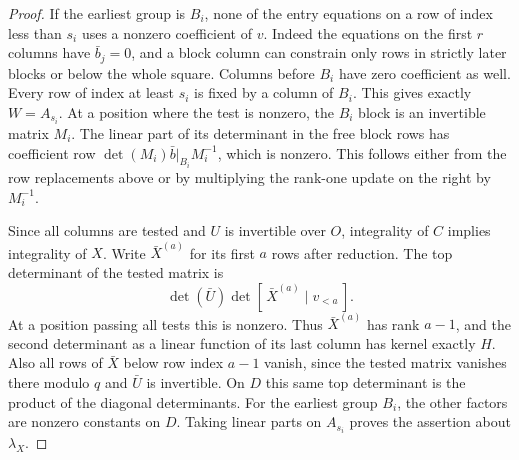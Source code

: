 \documentclass[a4paper,11pt]{article}
\theoremstyle{definition}
\theoremstyle{remark}
\numberwithin{equation}{section}
\begin{document}
\begin{proof}
If the earliest group is \(B_i\), none of the entry equations
on a row of index less than \(s_i\) uses a nonzero coefficient
of \(v\). Indeed the equations on the first \(r\) columns have
\(\bar b_j=0\), and a block column can constrain only rows
in strictly later blocks or below the whole square. Columns
before \(B_i\) have zero coefficient as well. Every row of
index at least \(s_i\) is fixed by a column of \(B_i\).
This gives exactly \(W=A_{s_i}\). At a position where the
test is nonzero, the \(B_i\) block is an invertible matrix
\(M_i\). The linear part of its determinant in the free block
rows has coefficient row \(\det(M_i)\bar b|_{B_i}M_i^{-1}\),
which is nonzero. This follows either from the row replacements
above or by multiplying the rank-one update on the right
by \(M_i^{-1}\).

Since all columns are tested and \(U\) is invertible over
\(O\), integrality of \(C\) implies integrality of \(X\).
Write \(\bar X^{(a)}\) for its first \(a\) rows after reduction.
The top determinant of the tested matrix is
\[
       \det(\bar U)\det[\,\bar X^{(a)}\mid v_{<a}\,].
\]
At a position passing all tests this is nonzero. Thus
\(\bar X^{(a)}\) has rank \(a-1\), and the second determinant
as a linear function of its last column has kernel exactly
\(H\). Also all rows of \(\bar X\) below row index \(a-1\)
vanish, since the tested matrix vanishes there modulo \(q\)
and \(\bar U\) is invertible. On \(D\) this same top
determinant is the product of the diagonal determinants.
For the earliest group \(B_i\), the other factors are
nonzero constants on \(D\). Taking linear parts on
\(A_{s_i}\) proves the assertion about \(\lambda_X\).
\end{proof}
\end{document}
